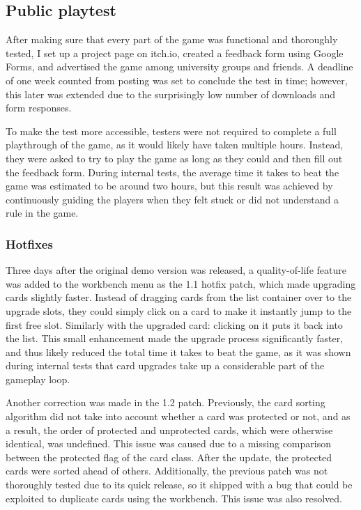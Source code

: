 \subsection{Public playtest}

After making sure that every part of the game was functional and thoroughly tested, I set up a project page on itch.io, created a feedback form using Google Forms, and advertised the game among university groups and friends. A deadline of one week counted from posting was set to conclude the test in time; however, this later was extended due to the surprisingly low number of downloads and form responses.

To make the test more accessible, testers were not required to complete a full playthrough of the game, as it would likely have taken multiple hours. Instead, they were asked to try to play the game as long as they could and then fill out the feedback form. During internal tests, the average time it takes to beat the game was estimated to be around two hours, but this result was achieved by continuously guiding the players when they felt stuck or did not understand a rule in the game.



\subsubsection{Hotfixes}

Three days after the original demo version was released, a quality-of-life feature was added to the workbench menu as the 1.1 hotfix patch, which made upgrading cards slightly faster. Instead of dragging cards from the list container over to the upgrade slots, they could simply click on a card to make it instantly jump to the first free slot. Similarly with the upgraded card: clicking on it puts it back into the list. This small enhancement made the upgrade process significantly faster, and thus likely reduced the total time it takes to beat the game, as it was shown during internal tests that card upgrades take up a considerable part of the gameplay loop.

Another correction was made in the 1.2 patch. Previously, the card sorting algorithm did not take into account whether a card was protected or not, and as a result, the order of protected and unprotected cards, which were otherwise identical, was undefined. This issue was caused due to a missing comparison between the protected flag of the card class. After the update, the protected cards were sorted ahead of others. Additionally, the previous patch was not thoroughly tested due to its quick release, so it shipped with a bug that could be exploited to duplicate cards using the workbench. This issue was also resolved.

